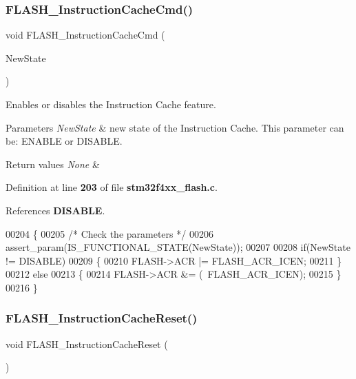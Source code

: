\subsubsection{F\+L\+A\+S\+H\+\_\+\+Instruction\+Cache\+Cmd()}
{\footnotesize\ttfamily void F\+L\+A\+S\+H\+\_\+\+Instruction\+Cache\+Cmd (\begin{DoxyParamCaption}\item[{\textbf{ Functional\+State}}]{New\+State }\end{DoxyParamCaption})}



Enables or disables the Instruction Cache feature. 


\begin{DoxyParams}{Parameters}
{\em New\+State} & new state of the Instruction Cache. This parameter can be\+: E\+N\+A\+B\+LE or D\+I\+S\+A\+B\+LE. \\
\hline
\end{DoxyParams}

\begin{DoxyRetVals}{Return values}
{\em None} & \\
\hline
\end{DoxyRetVals}


Definition at line \textbf{ 203} of file \textbf{ stm32f4xx\+\_\+flash.\+c}.



References \textbf{ D\+I\+S\+A\+B\+LE}.


\begin{DoxyCode}
00204 \{
00205   \textcolor{comment}{/* Check the parameters */}
00206   assert_param(IS_FUNCTIONAL_STATE(NewState));
00207   
00208   \textcolor{keywordflow}{if}(NewState != DISABLE)
00209   \{
00210     FLASH->ACR |= FLASH_ACR_ICEN;
00211   \}
00212   \textcolor{keywordflow}{else}
00213   \{
00214     FLASH->ACR &= (~FLASH_ACR_ICEN);
00215   \}
00216 \}
\end{DoxyCode}
\mbox{\label{group__FLASH_gaf6f1e54d9df32f3c196d67e59eb80a49}} 
\subsubsection{F\+L\+A\+S\+H\+\_\+\+Instruction\+Cache\+Reset()}
{\footnotesize\ttfamily void F\+L\+A\+S\+H\+\_\+\+Instruction\+Cache\+Reset (\begin{DoxyParamCaption}\item[{void}]{ }\end{DoxyParamCaption})}



